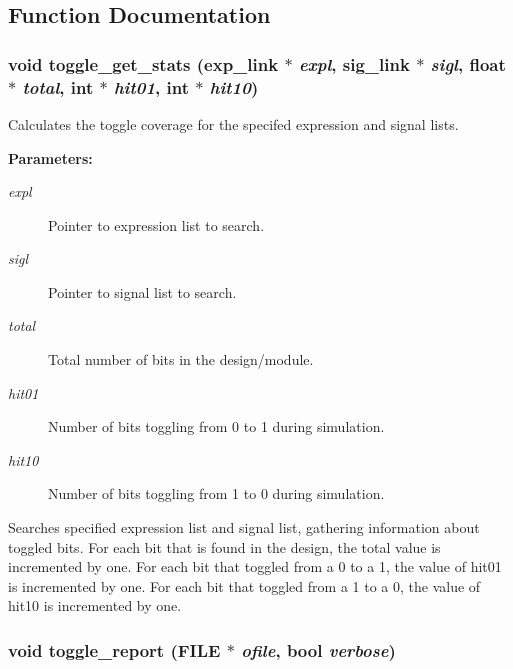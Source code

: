\subsection{Function Documentation}
\subsubsection{\setlength{\rightskip}{0pt plus 5cm}void toggle\_\-get\_\-stats ({\bf exp\_\-link} $\ast$ {\em expl}, {\bf sig\_\-link} $\ast$ {\em sigl}, float $\ast$ {\em total}, int $\ast$ {\em hit01}, int $\ast$ {\em hit10})}\label{toggle_8h_a0}


Calculates the toggle coverage for the specifed expression and signal lists.

\begin{Desc}
\item[{\bf Parameters: }]\par
\begin{description}
\item[
{\em expl}]Pointer to expression list to search. \item[
{\em sigl}]Pointer to signal list to search. \item[
{\em total}]Total number of bits in the design/module. \item[
{\em hit01}]Number of bits toggling from 0 to 1 during simulation. \item[
{\em hit10}]Number of bits toggling from 1 to 0 during simulation.

\end{description}
\end{Desc}
Searches specified expression list and signal list, gathering information  about toggled bits. For each bit that is found in the design, the total value is incremented by one. For each bit that toggled from a 0 to a 1, the value of hit01 is incremented by one. For each bit that toggled from a 1 to a 0, the value of hit10 is incremented by one. 
\subsubsection{\setlength{\rightskip}{0pt plus 5cm}void toggle\_\-report (FILE $\ast$ {\em ofile}, {\bf bool} {\em verbose})}\label{toggle_8h_a1}


